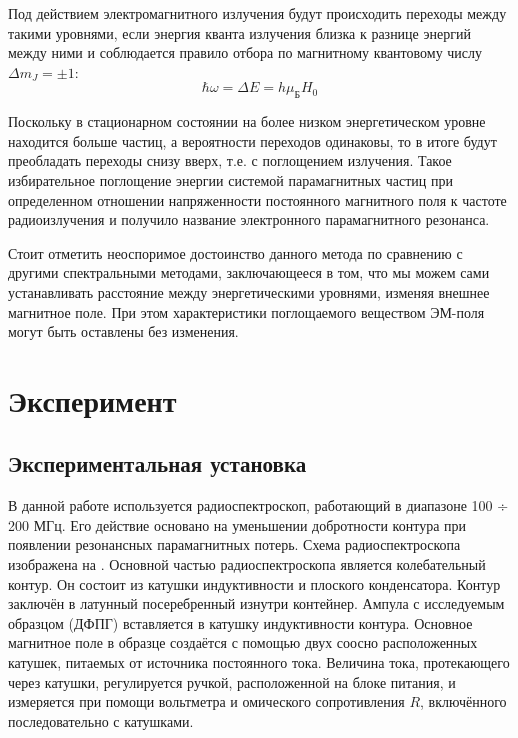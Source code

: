 \documentclass[a4paper, 12pt]{article}
\begin{document}
Под действием электромагнитного излучения будут происходить переходы
между такими уровнями, если энергия кванта излучения близка к разнице
энергий между ними и соблюдается правило отбора по магнитному
квантовому числу $\Delta m_J = \pm 1$:
\begin{equation}
    \hbar \omega = \Delta E = h \mu_\text{Б} H_0
    \label{eq:3}
\end{equation}


Поскольку в стационарном состоянии на более низком энергетическом
уровне находится больше частиц, а вероятности переходов одинаковы, то
в итоге будут преобладать переходы снизу вверх, т.е. с поглощением
излучения. Такое избирательное поглощение энергии системой
парамагнитных частиц при определенном отношении напряженности
постоянного магнитного поля к частоте радиоизлучения и получило
название электронного парамагнитного резонанса.

Стоит отметить неоспоримое достоинство данного метода по сравнению с
другими спектральными методами, заключающееся в
том, что мы можем сами устанавливать расстояние между энергетическими
уровнями, изменяя внешнее магнитное поле. При этом характеристики
поглощаемого веществом ЭМ-поля могут быть оставлены без изменения.




\section{Эксперимент}
\subsection{Экспериментальная установка}
В данной работе используется радиоспектроскоп, работающий в диапазоне
100 ÷ 200 МГц. Его действие основано на уменьшении добротности
контура при появлении резонансных парамагнитных потерь. Схема
радиоспектроскопа изображена на . Основной частью
радиоспектроскопа является колебательный контур. Он состоит из
катушки индуктивности и плоского конденсатора. Контур заключён в
латунный посеребренный изнутри контейнер. Ампула с исследуемым
образцом (ДФПГ) вставляется в катушку индуктивности контура. Основное
магнитное поле в образце создаётся с помощью двух соосно расположенных
катушек, питаемых от источника постоянного тока. Величина тока,
протекающего через катушки, регулируется ручкой, расположенной на
блоке питания, и измеряется при помощи вольтметра и омического
сопротивления $R$, включённого последовательно с катушками.
\end{document}
